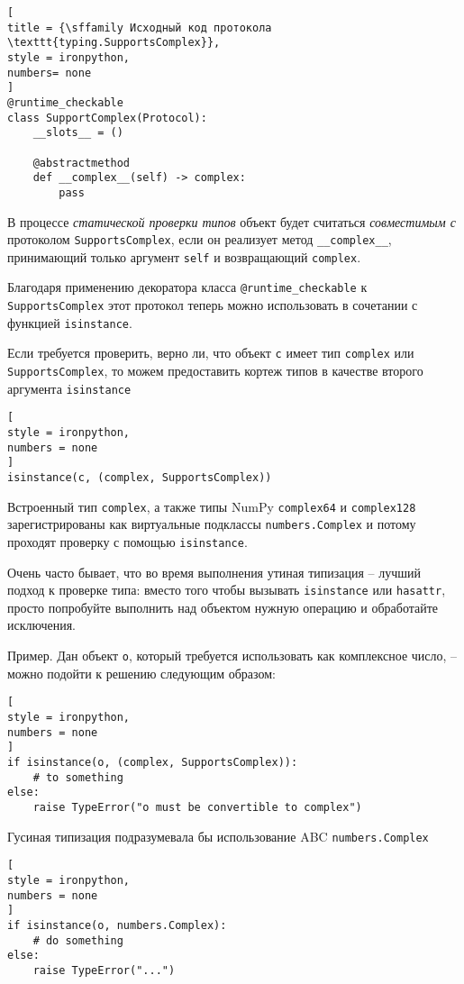 \documentclass[%
	11pt,
	a4paper,
	utf8,
		]{article}
\begin{document}
\begin{lstlisting}[
title = {\sffamily Исходный код протокола \texttt{typing.SupportsComplex}},
style = ironpython,
numbers= none
]
@runtime_checkable
class SupportComplex(Protocol):
    __slots__ = ()
    
    @abstractmethod
    def __complex__(self) -> complex:
        pass
\end{lstlisting}

В процессе \emph{статической проверки типов} объект будет считаться \emph{совместимым с} протоколом \verb|SupportsComplex|, если он реализует метод \verb*|__complex__|, принимающий только аргумент \verb*|self| и возвращающий \verb*|complex|.

Благодаря применению декоратора класса \verb*|@runtime_checkable| к \verb*|SupportsComplex| этот протокол теперь можно использовать в сочетании с функцией \verb*|isinstance|.

Если требуется проверить, верно ли, что объект \verb*|c| имеет тип \verb*|complex| или \verb*|SupportsComplex|, то можем предоставить кортеж типов в качестве второго аргумента \verb*|isinstance|
\begin{lstlisting}[
style = ironpython,
numbers = none
]
isinstance(c, (complex, SupportsComplex))
\end{lstlisting}

Встроенный тип \verb*|complex|, а также типы NumPy \verb*|complex64| и \verb*|complex128| зарегистрированы как виртуальные подклассы \verb|numbers.Complex| и потому проходят проверку с помощью \verb*|isinstance|.

Очень часто бывает, что во время выполнения утиная типизация -- лучший подход к проверке типа: вместо того чтобы вызывать \verb|isinstance| или \verb*|hasattr|, просто попробуйте выполнить над объектом нужную операцию и обработайте исключения.

Пример. Дан объект \verb|o|, который требуется использовать как комплексное число, -- можно подойти к решению следующим образом:
\begin{lstlisting}[
style = ironpython,
numbers = none
]
if isinstance(o, (complex, SupportsComplex)):
    # to something
else:
    raise TypeError("o must be convertible to complex")
\end{lstlisting}

Гусиная типизация подразумевала бы использование ABC \verb*|numbers.Complex|
\begin{lstlisting}[
style = ironpython,
numbers = none
]
if isinstance(o, numbers.Complex):
    # do something
else:
    raise TypeError("...")
\end{lstlisting}
\end{document}
